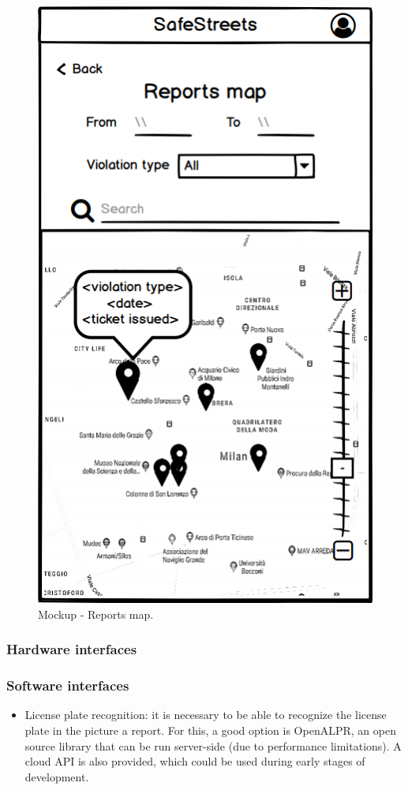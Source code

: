 \begin{@empty}
\begin{figure}[H]
\centering
\begin{minipage}{.4\textwidth}
    \centering
    \includegraphics[width=.8\textwidth]{Images/reports-map.png}
    \caption{\label{fig:mockup-reports-map}Mockup - Reports map.}
\end{minipage}
\end{figure}
\end{@empty}

\subsubsection{Hardware interfaces}
\subsubsection{Software interfaces}
\begin{itemize}
\item
License plate recognition: it is necessary to be able to recognize the license plate in the picture a report. For this, a good option is OpenALPR, an open source library that can be run server-side (due to performance limitations). A cloud API is also provided, which could be used during early stages of development.
\end{itemize}
